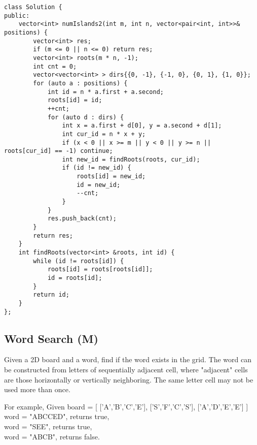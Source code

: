 \begin{lstlisting}
class Solution {
public:
    vector<int> numIslands2(int m, int n, vector<pair<int, int>>& positions) {
        vector<int> res;
        if (m <= 0 || n <= 0) return res;
        vector<int> roots(m * n, -1);
        int cnt = 0;
        vector<vector<int> > dirs{{0, -1}, {-1, 0}, {0, 1}, {1, 0}};
        for (auto a : positions) {
            int id = n * a.first + a.second;
            roots[id] = id;
            ++cnt;
            for (auto d : dirs) {
                int x = a.first + d[0], y = a.second + d[1];
                int cur_id = n * x + y;
                if (x < 0 || x >= m || y < 0 || y >= n || roots[cur_id] == -1) continue;
                int new_id = findRoots(roots, cur_id);
                if (id != new_id) {
                    roots[id] = new_id;
                    id = new_id;
                    --cnt;
                }
            }
            res.push_back(cnt);
        }
        return res;
    }
    int findRoots(vector<int> &roots, int id) {
        while (id != roots[id]) {
            roots[id] = roots[roots[id]];
            id = roots[id];
        }
        return id;
    }
};
\end{lstlisting}


\subsection{Word Search (M)}
Given a 2D board and a word, find if the word exists in the grid. The word can be constructed from letters of sequentially adjacent cell, where "adjacent" cells are those horizontally or vertically neighboring. The same letter cell may not be used more than once.

For example,
Given board =
[
  ['A','B','C','E'],
  ['S','F','C','S'],
  ['A','D','E','E']
]\\

word = "ABCCED", returns true,\\
word = "SEE", returns true,\\
word = "ABCB", returns false.\\


